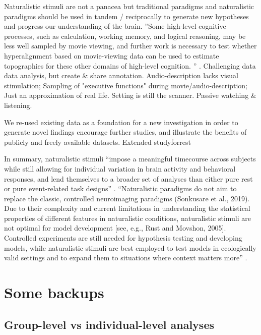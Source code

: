 
%
Naturalistic stimuli are not a panacea but traditional paradigms and
naturalistic paradigms should be used in tandem / reciprocally to generate new
hypotheses and progress our understanding of the brain.
%
''Some high-level cognitive processes, such as calculation, working memory, and
logical reasoning, may be less well sampled by movie viewing, and further work
is necessary to test whether hyperalignment based on movie-viewing data can be
used to estimate topographies for these other domains of high-level cognition.
'' \citep{jiahui2020predicting}.
%
Challenging data data analysis, but create \& share annotation.
%
Audio-description lacks visual stimulation; Sampling of "executive functions"
during movie/audio-description;
%
Just an approximation of real life.
%
Setting is still the scanner.
%
Passive watching \& listening.

%
We re-used existing data as a foundation for a new investigation in
order to generate novel findings encourage further studies, and illustrate the
benefits of publicly and freely available datasets.
%
Extended studyforrest

%
In summary, naturalistic stimuli ``impose a meaningful timecourse across
subjects while still allowing for individual variation in brain activity and
behavioral responses, and lend themselves to a broader set of analyses than
either pure rest or pure event-related task designs'' \citep{finn2017can}.
%
``Naturalistic paradigms do not aim to replace the classic, controlled
neuroimaging paradigms (Sonkusare et al., 2019).
%
Due to their complexity and current limitations in understanding the statistical
properties of different features in naturalistic conditions, naturalistic
stimuli are not optimal for model development [see, e.g., Rust and Movshon,
2005].
%
Controlled experiments are still needed for hypothesis testing and developing
models, while naturalistic stimuli are best employed to test models in
ecologically valid settings and to expand them to situations where context
matters more'' \citep{saarimaki2021naturalistic}.



\pagebreak


\section{Some backups}


\subsection{Group-level vs individual-level analyses}

